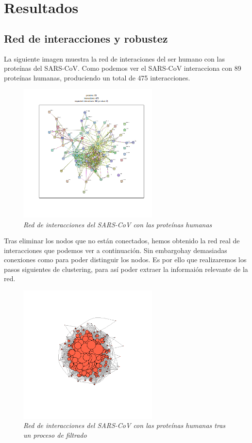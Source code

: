 
\section{Resultados}

\subsection{Red de interacciones y robustez}

La siguiente imagen muestra la red de interaciones del ser humano con las proteínas del SARS-CoV. Como podemos ver el SARS-CoV interacciona con 89 proteínas humanas, produciendo un total de 475 interacciones. 
\begin{figure}
	\centering
		\includegraphics[width=70mm,scale=1.2]{figures/string_hits.png}
		\caption{\textit{Red de interacciones del SARS-CoV con las proteínas humanas}}
\end{figure}

Tras eliminar los nodos que no están conectados, hemos obtenido la red real de interacciones que podemos ver a continuación. Sin embargohay demasiadas conexiones como para poder distinguir los nodos. Es por ello que realizaremos los pasos siguientes de clustering, para así poder extraer la informaión relevante de la red. 
\begin{figure}
	\centering
		\includegraphics[width=70mm,scale=1.2]{figures/hits.network_graph.png}
		\caption{\textit{Red de interacciones del SARS-CoV con las proteínas humanas tras un proceso de filtrado}}

\end{figure}

